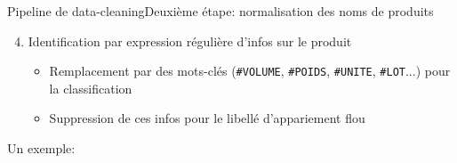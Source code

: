 \documentclass[ignorenonframetext,]{beamer}
\begin{document}
\begin{frame}{Pipeline de data-cleaning}{Deuxième étape: normalisation des noms de produits}

\begin{enumerate}
\setcounter{enumi}{3}
    \item Identification par expression régulière d'infos sur le produit
\begin{itemize}
    \item Remplacement par des mots-clés (\texttt{\#VOLUME}, \texttt{\#POIDS}, \texttt{\#UNITE}, \texttt{\#LOT}...) pour la classification
    \item Suppression de ces infos pour le libellé d'appariement flou
\end{itemize}    
\end{enumerate}

Un exemple: 

\begin{footnotesize}
\inputminted{python}{example-regex.py}
\end{footnotesize}

\begin{center}
\end{center}

\end{frame}
\end{document}

